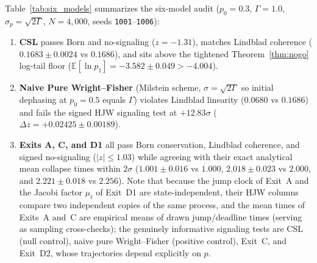 \documentclass[aps,pra,10pt,twocolumn,superscriptaddress,amsmath,amssymb,floatfix]{revtex4-2}
\newcommand{\E}{\mathbb{E}}
\begin{document}
Table~\ref{tab:six_models} summarizes the six-model audit ($p_0=0.3$, $\Gamma=1.0$, $\sigma_p = \sqrt{2\Gamma}$, $N=4{,}000$, seeds \texttt{1001}--\texttt{1006}):
\begin{enumerate}
\item \textbf{CSL} passes Born and no-signaling ($z=-1.31$), matches Lindblad coherence ($0.1683 \pm 0.0024$ vs $0.1686$), and sits above the tightened Theorem~\ref{thm:nogo} log-tail floor ($\E[\ln p_1] = -3.582 \pm 0.049 > -4.004$).
\item \textbf{Naive Pure Wright--Fisher} (Milstein scheme, $\sigma=\sqrt{2\Gamma}$ so initial dephasing at $p_0=0.5$ equals $\Gamma$) violates Lindblad linearity ($0.0680$ vs $0.1686$) and fails the signed HJW signaling test at $+12.83\sigma$ ($\Delta z = +0.02425 \pm 0.00189$).
\item \textbf{Exits A, C, and D1} all pass Born conservation, Lindblad coherence, and signed no-signaling ($|z| \le 1.03$) while agreeing with their exact analytical mean collapse times within $2\sigma$ ($1.001 \pm 0.016$ vs $1.000$, $2.018 \pm 0.023$ vs $2.000$, and $2.221 \pm 0.018$ vs $2.256$). Note that because the jump clock of Exit~A and the Jacobi factor $\mu_t$ of Exit~D1 are state-independent, their HJW columns compare two independent copies of the same process, and the mean times of Exits~A and~C are empirical means of drawn jump/deadline times (serving as sampling cross-checks); the genuinely informative signaling tests are CSL (null control), naive pure Wright--Fisher (positive control), Exit~C, and Exit~D2, whose trajectories depend explicitly on $p$.
\end{enumerate}
\end{document}
